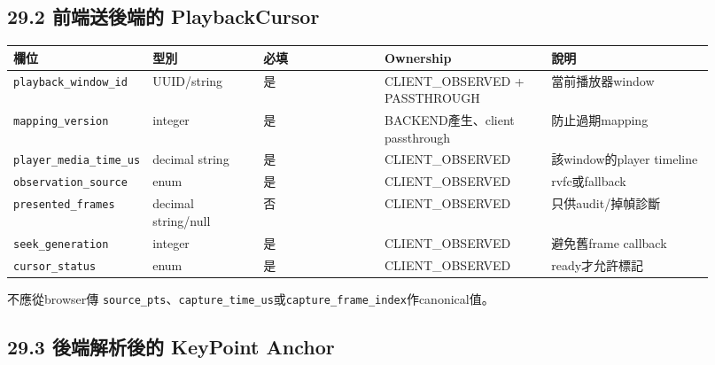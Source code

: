 \documentclass[
  9pt,
  a4paper,
]{article}
\begin{document}
\subsection{29.2 前端送後端的
PlaybackCursor}\label{292-ux524dux7aefux9001ux5f8cux7aefux7684-playbackcursor}

\begin{longtable}[]{@{}>{\RaggedRight\arraybackslash}p{0.10\linewidth}>{\RaggedRight\arraybackslash}p{0.16\linewidth}>{\RaggedRight\arraybackslash}p{0.18\linewidth}>{\RaggedRight\arraybackslash}p{0.24\linewidth}>{\RaggedRight\arraybackslash}p{0.24\linewidth}@{}}
\toprule\noalign{}
欄位 & 型別 & 必填 & Ownership & 說明 \\
\midrule\noalign{}
\endhead
\bottomrule\noalign{}
\endlastfoot
\texttt{playback\_\allowbreak{}window\_\allowbreak{}id} & UUID/string & 是 & CLIENT\_\allowbreak{}OBSERVED +
PASSTHROUGH & 當前播放器window \\
\texttt{mapping\_\allowbreak{}version} & integer & 是 & BACKEND產生、client
passthrough & 防止過期mapping \\
\texttt{player\_\allowbreak{}media\_\allowbreak{}time\_\allowbreak{}us} & decimal string & 是 &
CLIENT\_\allowbreak{}OBSERVED & 該window的player timeline \\
\texttt{observation\_\allowbreak{}source} & enum & 是 & CLIENT\_\allowbreak{}OBSERVED &
rvfc或fallback \\
\texttt{presented\_\allowbreak{}frames} & decimal string/null & 否 & CLIENT\_\allowbreak{}OBSERVED
& 只供audit/掉幀診斷 \\
\texttt{seek\_\allowbreak{}generation} & integer & 是 & CLIENT\_\allowbreak{}OBSERVED &
避免舊frame callback \\
\texttt{cursor\_\allowbreak{}status} & enum & 是 & CLIENT\_\allowbreak{}OBSERVED &
ready才允許標記 \\
\end{longtable}

不應從browser傳
\texttt{source\_\allowbreak{}pts}、\texttt{capture\_\allowbreak{}time\_\allowbreak{}us}或\texttt{capture\_\allowbreak{}frame\_\allowbreak{}index}作canonical值。

\subsection{29.3 後端解析後的 KeyPoint
Anchor}\label{293-ux5f8cux7aefux89e3ux6790ux5f8cux7684-keypoint-anchor}
\end{document}
